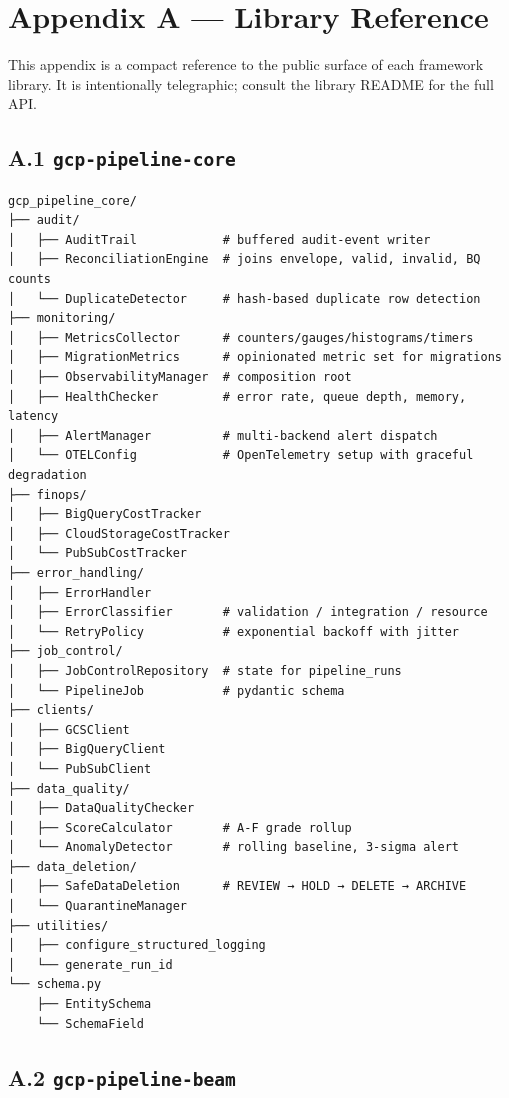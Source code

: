 \documentclass[
  11pt,
  british,
  oneside]{book}
\begin{document}
\newpage

\hypertarget{appendix-a-library-reference}{%
\chapter{Appendix A --- Library
Reference}\label{appendix-a-library-reference}}

This appendix is a compact reference to the public surface of each
framework library. It is intentionally telegraphic; consult the library
README for the full API.

\hypertarget{a.1-gcp-pipeline-core}{%
\section{\texorpdfstring{A.1
\texttt{gcp-pipeline-core}}{A.1 gcp-pipeline-core}}\label{a.1-gcp-pipeline-core}}

\begin{verbatim}
gcp_pipeline_core/
├── audit/
│   ├── AuditTrail            # buffered audit-event writer
│   ├── ReconciliationEngine  # joins envelope, valid, invalid, BQ counts
│   └── DuplicateDetector     # hash-based duplicate row detection
├── monitoring/
│   ├── MetricsCollector      # counters/gauges/histograms/timers
│   ├── MigrationMetrics      # opinionated metric set for migrations
│   ├── ObservabilityManager  # composition root
│   ├── HealthChecker         # error rate, queue depth, memory, latency
│   ├── AlertManager          # multi-backend alert dispatch
│   └── OTELConfig            # OpenTelemetry setup with graceful degradation
├── finops/
│   ├── BigQueryCostTracker
│   ├── CloudStorageCostTracker
│   └── PubSubCostTracker
├── error_handling/
│   ├── ErrorHandler
│   ├── ErrorClassifier       # validation / integration / resource
│   └── RetryPolicy           # exponential backoff with jitter
├── job_control/
│   ├── JobControlRepository  # state for pipeline_runs
│   └── PipelineJob           # pydantic schema
├── clients/
│   ├── GCSClient
│   ├── BigQueryClient
│   └── PubSubClient
├── data_quality/
│   ├── DataQualityChecker
│   ├── ScoreCalculator       # A-F grade rollup
│   └── AnomalyDetector       # rolling baseline, 3-sigma alert
├── data_deletion/
│   ├── SafeDataDeletion      # REVIEW → HOLD → DELETE → ARCHIVE
│   └── QuarantineManager
├── utilities/
│   ├── configure_structured_logging
│   └── generate_run_id
└── schema.py
    ├── EntitySchema
    └── SchemaField
\end{verbatim}

\hypertarget{a.2-gcp-pipeline-beam}{%
\section{\texorpdfstring{A.2
\texttt{gcp-pipeline-beam}}{A.2 gcp-pipeline-beam}}\label{a.2-gcp-pipeline-beam}}
\end{document}
